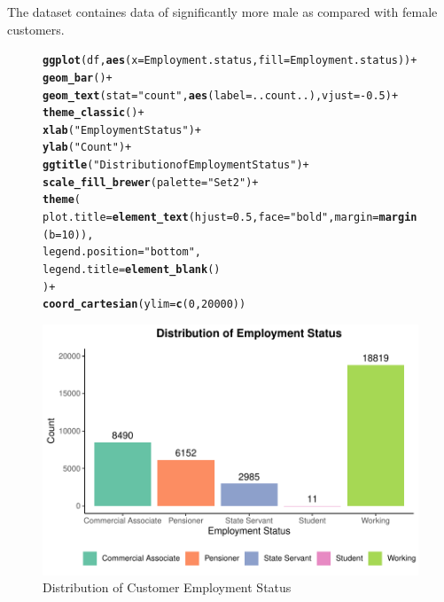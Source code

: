 \documentclass{article}\usepackage[]{graphicx}\usepackage[]{xcolor}
\makeatletter
\def\maxwidth{ %
  \ifdim\Gin@nat@width>\linewidth
    \linewidth
  \else
    \Gin@nat@width
  \fi
}
\newcommand{\hlnum}[1]{\textcolor[rgb]{0.686,0.059,0.569}{#1}}%
\newcommand{\hlsng}[1]{\textcolor[rgb]{0.192,0.494,0.8}{#1}}%
\newcommand{\hlopt}[1]{\textcolor[rgb]{0,0,0}{#1}}%
\newcommand{\hldef}[1]{\textcolor[rgb]{0.345,0.345,0.345}{#1}}%
\newcommand{\hlkwc}[1]{\textcolor[rgb]{0.333,0.667,0.333}{#1}}%
\newcommand{\hlkwd}[1]{\textcolor[rgb]{0.737,0.353,0.396}{\textbf{#1}}}%
\newenvironment{kframe}{%
 \def\at@end@of@kframe{}%
 \ifinner\ifhmode%
  \def\at@end@of@kframe{\end{minipage}}%
  \begin{minipage}{\columnwidth}%
 \fi\fi%
 \def\FrameCommand##1{\hskip\@totalleftmargin \hskip-\fboxsep
 \colorbox{shadecolor}{##1}\hskip-\fboxsep
     \hskip-\linewidth \hskip-\@totalleftmargin \hskip\columnwidth}%
 \MakeFramed {\advance\hsize-\width
   \@totalleftmargin\z@ \linewidth\hsize
   \@setminipage}}%
 {\par\unskip\endMakeFramed%
 \at@end@of@kframe}
\newenvironment{knitrout}{}{} %
\makeatother
\begin{document}
The dataset containes data of significantly more male as compared with female customers.

\begin{figure}[H] %
\centering
\begin{knitrout}
\color{fgcolor}\begin{kframe}
\begin{alltt}
\hlkwd{ggplot}\hldef{(df,} \hlkwd{aes}\hldef{(}\hlkwc{x} \hldef{= Employment.status,} \hlkwc{fill} \hldef{= Employment.status))} \hlopt{+}
  \hlkwd{geom_bar}\hldef{()} \hlopt{+}
  \hlkwd{geom_text}\hldef{(}\hlkwc{stat} \hldef{=} \hlsng{"count"}\hldef{,} \hlkwd{aes}\hldef{(}\hlkwc{label} \hldef{= ..count..),} \hlkwc{vjust} \hldef{=} \hlopt{-}\hlnum{0.5}\hldef{)} \hlopt{+}
  \hlkwd{theme_classic}\hldef{()} \hlopt{+}
  \hlkwd{xlab}\hldef{(}\hlsng{"Employment Status"}\hldef{)} \hlopt{+}
  \hlkwd{ylab}\hldef{(}\hlsng{"Count"}\hldef{)} \hlopt{+}
  \hlkwd{ggtitle}\hldef{(}\hlsng{"Distribution of Employment Status"}\hldef{)} \hlopt{+}
  \hlkwd{scale_fill_brewer}\hldef{(}\hlkwc{palette} \hldef{=} \hlsng{"Set2"}\hldef{)} \hlopt{+}
  \hlkwd{theme}\hldef{(}
    \hlkwc{plot.title} \hldef{=} \hlkwd{element_text}\hldef{(}\hlkwc{hjust} \hldef{=} \hlnum{0.5}\hldef{,} \hlkwc{face} \hldef{=} \hlsng{"bold"}\hldef{,} \hlkwc{margin} \hldef{=} \hlkwd{margin}\hldef{(}\hlkwc{b} \hldef{=} \hlnum{10}\hldef{)),}
    \hlkwc{legend.position} \hldef{=} \hlsng{"bottom"}\hldef{,}
    \hlkwc{legend.title} \hldef{=} \hlkwd{element_blank}\hldef{()}
  \hldef{)} \hlopt{+}
  \hlkwd{coord_cartesian}\hldef{(}\hlkwc{ylim} \hldef{=} \hlkwd{c}\hldef{(}\hlnum{0}\hldef{,} \hlnum{20000}\hldef{))}
\end{alltt}
\end{kframe}
\includegraphics[width=\maxwidth]{figure/unnamed-chunk-17-1} 
\end{knitrout}
\vspace{-10pt} %
\caption{Distribution of Customer Employment Status}
\end{figure}
\end{document}
